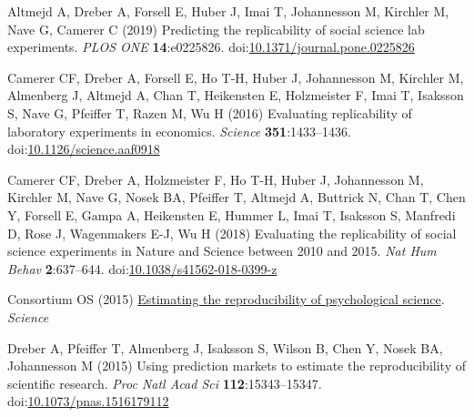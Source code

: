 \documentclass[
  english,
  a4paper,
]{article}
\newlength{\cslhangindent}
\newlength{\cslentryspacingunit} %
\newenvironment{CSLReferences}[2] %
 {%
  \setlength{\parindent}{0pt}
  \ifodd #1
  \let\oldpar\par
  \def\par{\hangindent=\cslhangindent\oldpar}
  \fi
  \setlength{\parskip}{#2\cslentryspacingunit}
 }%
 {}
\begin{document}
\hypertarget{refs}{}
\begin{CSLReferences}{1}{0}
\leavevmode{}%
Altmejd A, Dreber A, Forsell E, Huber J, Imai T, Johannesson M, Kirchler M, Nave G, Camerer C (2019) Predicting the replicability of social science lab experiments. \emph{PLOS ONE} \textbf{14}:e0225826. doi:\href{https://doi.org/10.1371/journal.pone.0225826}{10.1371/journal.pone.0225826}

\leavevmode{}%
Camerer CF, Dreber A, Forsell E, Ho T-H, Huber J, Johannesson M, Kirchler M, Almenberg J, Altmejd A, Chan T, Heikensten E, Holzmeister F, Imai T, Isaksson S, Nave G, Pfeiffer T, Razen M, Wu H (2016) Evaluating replicability of laboratory experiments in economics. \emph{Science} \textbf{351}:1433--1436. doi:\href{https://doi.org/10.1126/science.aaf0918}{10.1126/science.aaf0918}

\leavevmode{}%
Camerer CF, Dreber A, Holzmeister F, Ho T-H, Huber J, Johannesson M, Kirchler M, Nave G, Nosek BA, Pfeiffer T, Altmejd A, Buttrick N, Chan T, Chen Y, Forsell E, Gampa A, Heikensten E, Hummer L, Imai T, Isaksson S, Manfredi D, Rose J, Wagenmakers E-J, Wu H (2018) Evaluating the replicability of social science experiments in {Nature} and {Science} between 2010 and 2015. \emph{Nat Hum Behav} \textbf{2}:637--644. doi:\href{https://doi.org/10.1038/s41562-018-0399-z}{10.1038/s41562-018-0399-z}

\leavevmode{}%
Consortium OS (2015) \href{https://www.science.org/doi/full/10.1126/science.aac4716?casa_token=IJ35TwwlcjsAAAAA\%3AqiP68QbVAHleIg9zD3WugKWuV6Oa5rswS0VQnDsCq5I14ME4WIQabNGVD_T6SBSuAt6voVHNnWc0sw}{Estimating the reproducibility of psychological science}. \emph{Science}

\leavevmode{}%
Dreber A, Pfeiffer T, Almenberg J, Isaksson S, Wilson B, Chen Y, Nosek BA, Johannesson M (2015) Using prediction markets to estimate the reproducibility of scientific research. \emph{Proc Natl Acad Sci} \textbf{112}:15343--15347. doi:\href{https://doi.org/10.1073/pnas.1516179112}{10.1073/pnas.1516179112}


\end{CSLReferences}
\end{document}
